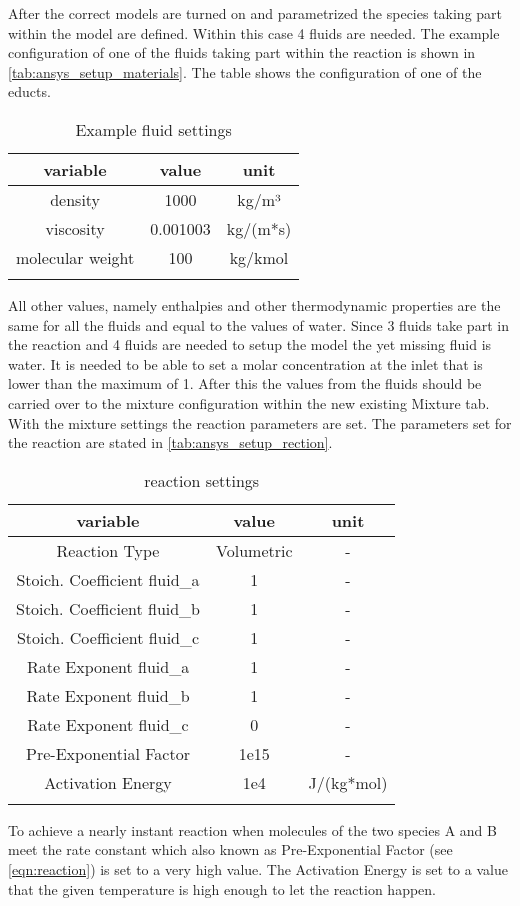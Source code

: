 \documentclass[../thesis.tex]{subfiles}
\begin{document}
After the correct models are turned on and parametrized the species taking part within the model are defined. Within this case 4 fluids are needed. The example configuration of one of the fluids taking part within the reaction is shown in \autoref{tab:ansys_setup_materials}. The table shows the configuration of one of the educts.
\begin{table} [htb]
	\centering
	\caption{Example fluid settings}
	\begin{tabular}{ ccc }
		\hline
		variable & value & unit \\
		\hline
		density & 1000 & kg/m³ \\
		viscosity & 0.001003 & kg/(m*s) \\
		molecular weight & 100 & kg/kmol \\
		\hline
		\label{tab:ansys_setup_materials}
	\end{tabular}
\end{table}
All other values, namely enthalpies and other thermodynamic properties are the same for all the fluids and equal to the values of water. Since 3 fluids take part in the reaction and 4 fluids are needed to setup the model the yet missing fluid is water. It is needed to be able to set a molar concentration at the inlet that is lower than the maximum of 1. After this the values from the fluids should be carried over to the mixture configuration within the new existing Mixture tab. With the mixture settings the reaction parameters are set. The parameters set for the reaction are stated in \autoref{tab:ansys_setup_rection}.
\begin{table} [htb]
	\centering
	\caption{reaction settings}
	\begin{tabular}{ ccc }
		\hline
		variable & value & unit \\
		\hline
		Reaction Type & Volumetric & - \\
		Stoich. Coefficient fluid\_a & 1 & - \\
		Stoich. Coefficient fluid\_b & 1 & - \\
		Stoich. Coefficient fluid\_c & 1 & - \\
		Rate Exponent fluid\_a & 1 & - \\
		Rate Exponent fluid\_b & 1 & - \\
		Rate Exponent fluid\_c & 0 & - \\
		Pre-Exponential Factor & 1e15 & - \\
		Activation Energy & 1e4 & J/(kg*mol) \\
		\hline
		\label{tab:ansys_setup_rection}
	\end{tabular}
\end{table}
To achieve a nearly instant reaction when molecules of the two species A and B meet the rate constant which also known as Pre-Exponential Factor (see \autoref{eqn:reaction}) is set to a very high value. The Activation Energy is set to a value that the given temperature is high enough to let the reaction happen.
\end{document}
